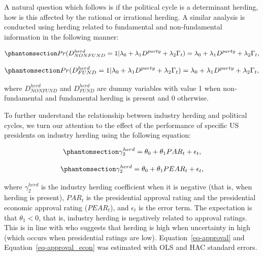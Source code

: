 \documentclass[
  letterpaper,
  DIV=11,
  numbers=noendperiod]{scrartcl}
\begin{document}
A natural question which follows is if the political cycle is a
determinant herding, how is this affected by the rational or irrational
herding. A similar analysis is conducted using herding related to
fundamental and non-fundamental information in the following manner:

\begin{equation}\phantomsection\label{eq-politicalnonfund}{
Pr(D^{herd}_{NONFUND} = 1 |\lambda_0 +  \lambda_1D^{party}  + \lambda_2\Gamma_t) = \lambda_0 +  \lambda_1D^{party}  + \lambda_2\Gamma_t,
}\end{equation}

\begin{equation}\phantomsection\label{eq-politicalfund}{Pr(D^{herd}_{FUND}= 1 |\lambda_0 +  \lambda_1D^{party}  + \lambda_2\Gamma_t) = \lambda_0 +  \lambda_1D^{party}  + \lambda_2\Gamma_t,}\end{equation}

where \(D^{herd}_{NONFUND}\) and \(D^{herd}_{FUND}\) are dummy variables
with value 1 when non-fundamental and fundamental herding is present and
0 otherwise.

To further understand the relationship between industry herding and
political cycles, we turn our attention to the effect of the performance
of specific US presidents on industry herding using the following
equation:

\begin{equation}\phantomsection\label{eq-approval}{
\gamma_2^{herd} = \theta_0 + \theta_1PAR_t + \epsilon_{t}, 
}\end{equation}

\begin{equation}\phantomsection\label{eq-approval_econ}{
\gamma_2^{herd} = \theta_0 + \theta_1PEAR_t + \epsilon_{t}, 
}\end{equation}

where \(\gamma_2^{herd}\) is the industry herding coefficient when it is
negative (that is, when herding is present), \(PAR_t\) is the
presidential approval rating and the presidential economic approval
rating (\(PEAR_t\)), and \(\epsilon_{t}\) is the error term. The
expectation is that \(\theta_1 < 0\), that is, industry herding is
negatively related to approval ratings. This is in line with
\citet{pastor2020political} who suggests that herding is high when
uncertainty in high (which occurs when presidential ratings are low).
Equation~\ref{eq-approval} and Equation~\ref{eq-approval_econ} was
estimated with OLS and HAC standard errors.
\end{document}
